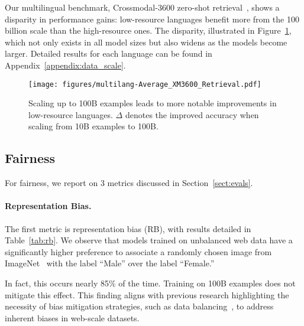 Our multilingual benchmark, Crossmodal-3600 zero-shot retrieval~\cite{thapliyal2022crossmodal}, shows a disparity in performance gains: low-resource languages benefit more from the 100 billion scale than the high-resource ones. The disparity, illustrated in Figure~\ref{fig:multilinguality}, which not only exists in all model sizes but also widens as the models become larger. Detailed results for each language can be found in Appendix~\ref{appendix:data_scale}.

\begin{figure}[h!]
    \texttt{[image: figures/multilang-Average\_XM3600\_Retrieval.pdf]}
    \caption{Scaling up to 100B examples leads to more notable improvements in low-resource languages. $\Delta$ denotes the improved accuracy when scaling from 10B examples to 100B.}
    \label{fig:multilinguality}
\end{figure}


\subsection{Fairness}
For fairness, we report on 3 metrics discussed in Section~\ref{sect:evals}. 

\paragraph{Representation Bias.} The first metric is representation bias (RB), with results detailed in Table~\ref{tab:rb}. We observe that models trained on unbalanced web data have a significantly higher preference to associate a randomly chosen image from ImageNet~\cite{deng2009imagenet} with the label ``Male'' over the label ``Female.'' 

In fact, this occurs nearly 85\% of the time. Training on 100B examples does not mitigate this effect. This finding aligns with previous research highlighting the necessity of bias mitigation strategies, such as data balancing~\cite{alabdulmohsin2024clip}, to address inherent biases in web-scale datasets.





